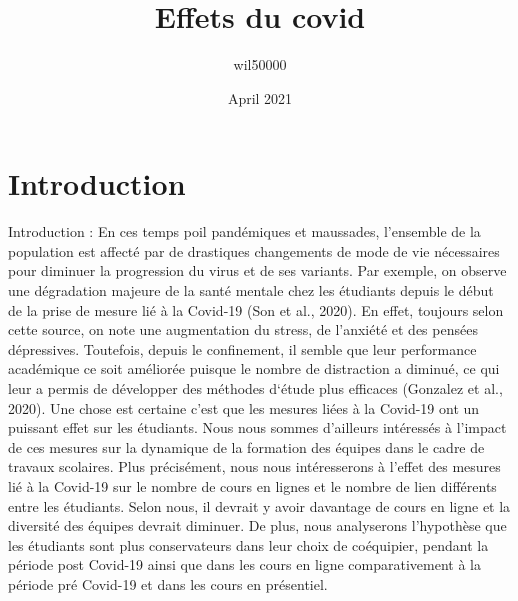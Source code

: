 \documentclass{article}
\title{Effets du covid}
\author{wil50000 }
\date{April 2021}
\begin{document}
\maketitle

\section{Introduction}
Introduction :  
En ces temps poil pandémiques et maussades, l’ensemble de la population est affecté par de drastiques changements de mode de vie nécessaires pour diminuer la progression du virus et de ses variants. Par exemple, on observe une dégradation majeure de la santé mentale chez les étudiants depuis le début de la prise de mesure lié à la Covid-19 (Son et al., 2020). En effet, toujours selon cette source, on note une augmentation du stress, de l’anxiété et des pensées dépressives. Toutefois, depuis le confinement, il semble que leur performance académique ce soit améliorée puisque le nombre de distraction a diminué, ce qui leur a permis de développer des méthodes d‘étude plus efficaces (Gonzalez et al., 2020). Une chose est certaine c’est que les mesures liées à la Covid-19 ont un puissant effet sur les étudiants. Nous nous sommes d’ailleurs intéressés à l’impact de ces mesures sur la dynamique de la formation des équipes dans le cadre de travaux scolaires. Plus précisément, nous nous intéresserons à l’effet des mesures lié à la Covid-19 sur le nombre de cours en lignes et le nombre de lien différents entre les étudiants. Selon nous, il devrait y avoir davantage de cours en ligne et la diversité des équipes devrait diminuer. De plus, nous analyserons l’hypothèse que les étudiants sont plus conservateurs dans leur choix de coéquipier, pendant la période post Covid-19 ainsi que dans les cours en ligne comparativement à la période pré Covid-19 et dans les cours en présentiel. 
\end{document}
